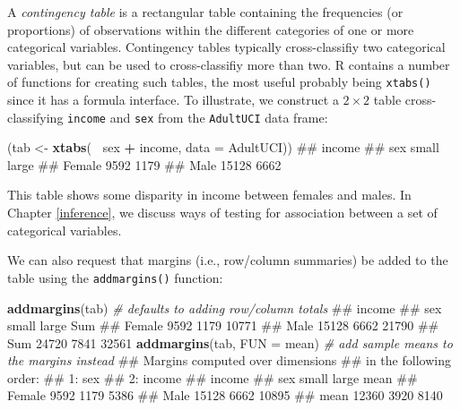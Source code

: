 \documentclass[]{book}
\newenvironment{Shaded}{\begin{snugshade}}{\end{snugshade}}
\newcommand{\CommentTok}[1]{\textcolor[rgb]{0.56,0.35,0.01}{\textit{#1}}}
\newcommand{\DataTypeTok}[1]{\textcolor[rgb]{0.13,0.29,0.53}{#1}}
\newcommand{\KeywordTok}[1]{\textcolor[rgb]{0.13,0.29,0.53}{\textbf{#1}}}
\newcommand{\NormalTok}[1]{#1}
\newcommand{\OperatorTok}[1]{\textcolor[rgb]{0.81,0.36,0.00}{\textbf{#1}}}
\newcommand{\StringTok}[1]{\textcolor[rgb]{0.31,0.60,0.02}{#1}}
\theoremstyle{definition}
\theoremstyle{definition}
\theoremstyle{definition}
\theoremstyle{remark}
\begin{document}
A \emph{contingency table} is a rectangular table containing the
frequencies (or proportions) of observations within the different
categories of one or more categorical variables. Contingency tables
typically cross-classifiy two categorical variables, but can be used to
cross-classifiy more than two. R contains a number of functions for
creating such tables, the most useful probably being \texttt{xtabs()}
since it has a formula interface. To illustrate, we construct a
\(2 \times 2\) table cross-classifying \texttt{income} and \texttt{sex}
from the \texttt{AdultUCI} data frame:

\begin{Shaded}
\begin{Highlighting}[]
\NormalTok{(tab <-}\StringTok{ }\KeywordTok{xtabs}\NormalTok{(}\OperatorTok{~}\StringTok{ }\NormalTok{sex }\OperatorTok{+}\StringTok{ }\NormalTok{income, }\DataTypeTok{data =}\NormalTok{ AdultUCI))}
\NormalTok{##         income}
\NormalTok{## sex      small large}
\NormalTok{##   Female  9592  1179}
\NormalTok{##   Male   15128  6662}
\end{Highlighting}
\end{Shaded}

This table shows some disparity in income between females and males. In
Chapter \ref{inference}, we discuss ways of testing for association
between a set of categorical variables.

We can also request that margins (i.e., row/column summaries) be added
to the table using the \texttt{addmargins()} function:

\begin{Shaded}
\begin{Highlighting}[]
\KeywordTok{addmargins}\NormalTok{(tab)  }\CommentTok{# defaults to adding row/column totals}
\NormalTok{##         income}
\NormalTok{## sex      small large   Sum}
\NormalTok{##   Female  9592  1179 10771}
\NormalTok{##   Male   15128  6662 21790}
\NormalTok{##   Sum    24720  7841 32561}
\KeywordTok{addmargins}\NormalTok{(tab, }\DataTypeTok{FUN =}\NormalTok{ mean)  }\CommentTok{# add sample means to the margins instead}
\NormalTok{## Margins computed over dimensions}
\NormalTok{## in the following order:}
\NormalTok{## 1: sex}
\NormalTok{## 2: income}
\NormalTok{##         income}
\NormalTok{## sex      small large  mean}
\NormalTok{##   Female  9592  1179  5386}
\NormalTok{##   Male   15128  6662 10895}
\NormalTok{##   mean   12360  3920  8140}
\end{Highlighting}
\end{Shaded}
\end{document}

